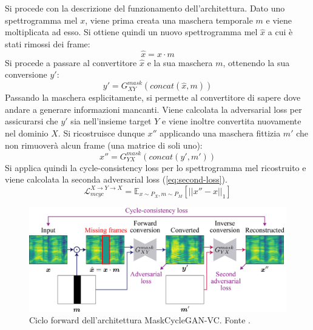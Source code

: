 			Si procede con la descrizione del funzionamento dell'architettura.
			Dato uno spettrogramma mel $x$, viene prima creata una maschera temporale $m$ e viene moltiplicata ad esso. Si ottiene quindi un nuovo spettrogramma mel $\hat{x}$ a cui è stati rimossi dei frame:
			\begin{equation}
				\hat{x}=x \cdot m
			\end{equation}
			Si procede a passare al convertitore $\hat{x}$ e la sua maschera $m$, ottenendo la sua conversione $y'$:
			\begin{equation}
				y' = G_{XY}^{mask}(concat(\hat{x}, m))
			\end{equation}
			Passando la maschera esplicitamente, si permette al convertitore di sapere dove andare a generare informazioni mancanti.
			Viene calcolata la adversarial loss per assicurarsi che $y'$ sia nell'insieme target $Y$ e viene inoltre convertita nuovamente nel dominio $X$. Si ricostruisce dunque $x''$ applicando una maschera fittizia $m'$ che non rimuoverà alcun frame (una matrice di soli uno):
			\begin{equation}
				x'' = G_{YX}^{mask}(concat(y', m'))
			\end{equation}
			Si applica quindi la cycle-consistency loss per lo spettrogramma mel ricostruito e viene calcolata la seconda adversarial loss (\ref{eq:second-loss}).
			\begin{equation}
				\mathcal{L}_{mcyc}^{X \rightarrow Y \rightarrow X} = \mathbb{E}_{x \sim P_X,m \sim P_M}[||x''-x||_1]
			\end{equation}
			
			\begin{figure}[h]
				\centering
				\includegraphics[width=1\linewidth]{figures/MaskCycleGAN-VC}
				\caption{Ciclo forward dell'architettura MaskCycleGAN-VC. Fonte \cite{MaskCyclegan-VC}.}
				\label{fig:maskcyclegan-vc}
			\end{figure}
			
	